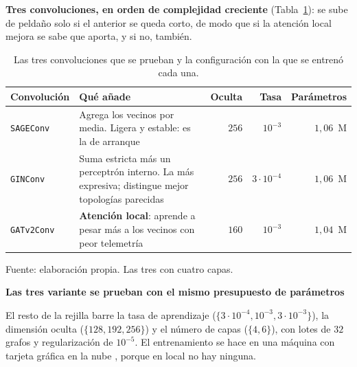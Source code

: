 \textbf{Tres convoluciones, en orden de complejidad creciente} (Tabla~\ref{tab:convs}): se sube
de peldaño solo si el anterior se queda corto, de modo que si la atención local mejora se sabe
que aporta, y si no, también.

\begin{table}[!ht]
    \centering
    \caption{Las tres convoluciones que se prueban y la configuración con la que se entrenó
             cada una.}
    \label{tab:convs}
    {\footnotesize
    \begin{tabular}{@{}p{}p{}rrr@{}}
        \toprule
        \textbf{Convolución} & \textbf{Qué añade} & \textbf{Oculta} & \textbf{Tasa}
            & \textbf{Parámetros} \\
        \midrule
        \texttt{SAGEConv} \cite{hamilton2017sage}
            & Agrega los vecinos por media. Ligera y estable: es la de arranque
            & $256$ & $10^{-3}$ & $1{,}06$~M \\
        \texttt{GINConv} \cite{xu2019gin}
            & Suma estricta más un perceptrón interno. La más expresiva; distingue mejor
              topologías parecidas
            & $256$ & $3\cdot10^{-4}$ & $1{,}06$~M \\
        \texttt{GATv2Conv} \cite{brody2022gatv2}
            & \textbf{Atención local}: aprende a pesar más a los vecinos con peor telemetría
            & $160$ & $10^{-3}$ & $1{,}04$~M \\
        \bottomrule
    \end{tabular}}

    {\footnotesize Fuente: elaboración propia. Las tres con cuatro capas.}
\end{table}

\textbf{Las tres variante se prueban con el mismo presupuesto de
parámetros}

El resto de la rejilla barre la tasa de aprendizaje ($\{3\cdot10^{-4}, 10^{-3},
3\cdot10^{-3}\}$), la dimensión oculta ($\{128, 192, 256\}$) y el número de capas ($\{4, 6\}$),
con lotes de $32$ grafos y regularización de $10^{-5}$. El entrenamiento se hace en una máquina
con tarjeta gráfica en la nube \cite{google2026cloud}, porque en local no hay ninguna.